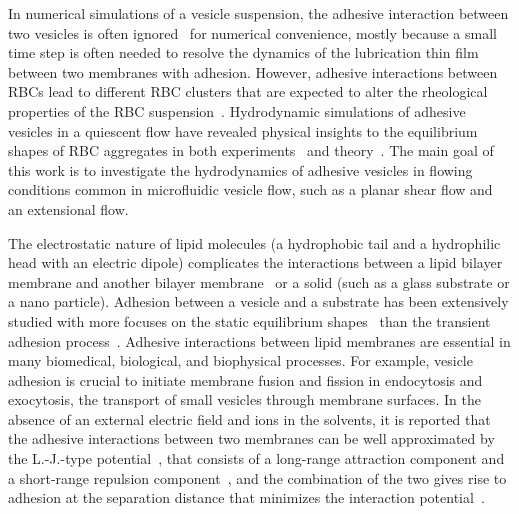 \documentclass[prf,superscriptaddress,showpacs]{revtex4-1}
\begin{document}
In numerical simulations of a vesicle suspension, the adhesive
interaction between two vesicles is often
ignored~\cite{Veerapaneni2009_JCP,  RahimianVeerapaneniBiros2010_JCP}
for numerical convenience, mostly because a small time step is often
needed to resolve the dynamics of the lubrication thin film between two
membranes with adhesion.  However, adhesive interactions between RBCs
lead to different RBC clusters that are expected to alter the
rheological properties of the RBC suspension~\cite{NeuMeiselman2002_BJ,
SvetinaZiherl2008_Bioelectrochemistry}. Hydrodynamic simulations of
adhesive vesicles in a quiescent flow have revealed physical insights to
the equilibrium shapes of RBC aggregates in both
experiments~\cite{FlormannAouane2017_SciReports} and
theory~\cite{ZiherlSvetina2007_PNAS}. The main goal of this work is to
investigate the hydrodynamics of adhesive vesicles in flowing conditions
common in microfluidic vesicle flow, such as a planar shear flow and an
extensional flow.

The electrostatic nature of lipid molecules (a hydrophobic tail and a
hydrophilic head with an electric dipole) complicates the interactions
between a lipid bilayer membrane and another bilayer
membrane~\cite{EvansMetcalfe1984_BJ, Book_PhysicalBasisCellAdhesion,
Book_IntermolecularSurfaceForces, PerutkovaFrank-Bertoncelij2013_CSB} or
a solid (such as a glass substrate or a nano particle).  Adhesion
between a vesicle and a substrate has been extensively studied with more
focuses on the static equilibrium shapes~\cite{Seifert1990_PRA,
ShiFengGao2006_ActaMechSin, LinFreund2007_IntJSolidsStructures,
GruhnFrankeDimova2007_Langmuir,das2008adhesion, zhang2009phase,
SteinkuhlerAgudo-Canalejo2016_BJ} than the transient adhesion
process~\cite{cantat1999lift, suk-sei2001, BlountMiksisDavis2013_PRSa}.
Adhesive interactions between lipid membranes are essential in many
biomedical, biological, and biophysical processes.  For example, vesicle
adhesion is crucial to initiate membrane fusion and fission in
endocytosis and exocytosis, the transport of small vesicles through
membrane surfaces.  In the absence of an external electric field and
ions in the solvents, it is reported that the adhesive interactions
between two membranes can be well approximated by the L.-J.-type
potential~\cite{FlormannAouane2017_SciReports}, that consists of a
long-range attraction component and a short-range repulsion
component~\cite{Book_IntermolecularSurfaceForces}, and the combination
of the two gives rise to adhesion at the separation distance that
minimizes the interaction
potential~\cite{Book_IntermolecularSurfaceForces}. 
\end{document}
